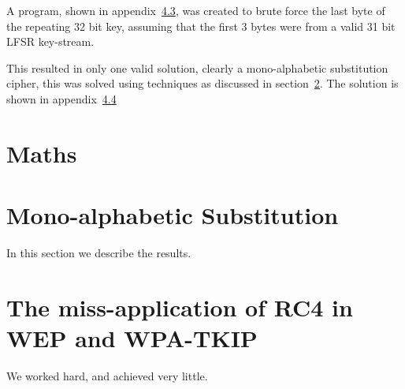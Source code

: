 \documentclass[pdftex, 12pt, a4paper]{article}
\begin{document}
A program, shown in appendix~\ref{last-byte}, was created to brute force the last byte of the repeating 32 bit key, assuming that the first 3 bytes were from a valid 31 bit LFSR key-stream.

This resulted in only one valid solution, clearly a mono-alphabetic substitution cipher, this was solved using techniques as discussed in section~\ref{mono}.  The solution is shown in appendix~\ref{q1-solution}

\section{Maths}

\section{Mono-alphabetic Substitution}\label{mono}
In this section we describe the results.

\section{The miss-application of RC4 in WEP and WPA-TKIP}\label{conclusions}
We worked hard, and achieved very little.




\appendices
\section{}
\subsection{}\label{break-lfsr}

\pagebreak
\subsection{}\label{break-lfsr-out}
\pagebreak
\subsection{}\label{last-byte}

\pagebreak
\subsection{}\label{q1-solution}
%
\end{document}
